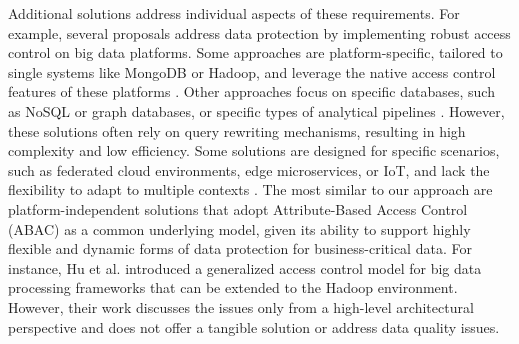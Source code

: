 Additional solutions address individual aspects of these requirements. For example, several proposals address data protection by implementing robust access control on big data platforms. Some approaches are platform-specific, tailored to single systems like MongoDB or Hadoop, and leverage the native access control features of these platforms \cite{rathore2017hadoop,anisetti2018privacy,FederationAC:Journ:2020,Sandhu:ABAC:2018,GuptaSandu:2017}. Other approaches focus on specific databases, such as NoSQL or graph databases, or specific types of analytical pipelines \cite{AConGraphDB:2021, AConMongoDB:2022, ABACforHBase:2019}. However, these solutions often rely on query rewriting mechanisms, resulting in high complexity and low efficiency. Some solutions are designed for specific scenarios, such as federated cloud environments, edge microservices, or IoT, and lack the flexibility to adapt to multiple contexts \cite{MultipartyAC:2019, IoTSecurity}.
%
The most similar to our approach are platform-independent solutions that adopt Attribute-Based Access Control (ABAC) \cite{XACML3.0} as a common underlying model, given its ability to support highly flexible and dynamic forms of data protection for business-critical data. {\color{OurColor}For instance, Hu et al. \cite{ HUFerraiolo:2014} introduced a generalized access control model for big data processing frameworks that can be extended to the Hadoop environment. However, their work discusses the issues only from a high-level architectural perspective and does not offer a tangible solution or address data quality issues.}

